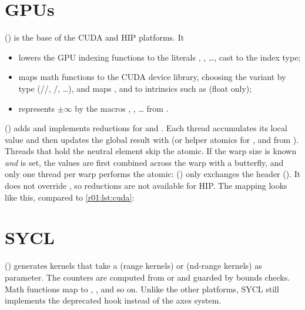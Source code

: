 \section{GPUs}\label{r01:sec:gpu-platforms}

 () is the base of the CUDA and HIP platforms. It
\begin{itemize}
  \item lowers the GPU indexing functions to the literals ,
        , \dots, cast to the index type;
  \item maps math functions to the CUDA device library, choosing the variant by type
        (//, /, \dots), and maps
        ,  and  to intrinsics
        such as  (float only);
  \item represents $\pm\infty$ by the macros ,
        , \dots{} from .
\end{itemize}
 () adds  and
implements reductions for  and . Each thread accumulates its
local value and then updates the global result with  (or helper atomics
for ,  and  from ). Threads that
hold the neutral element skip the atomic. If the warp size is known \emph{and}
 is set, the values are first combined across
the warp with a  butterfly, and only one thread per warp performs
the atomic:
 () only exchanges the header
(). It does not override , so
reductions are not available for HIP. The  mapping looks like this,
compared to \cref{r01:lst:cuda}:

\section{SYCL}
 () generates kernels that take a 
(range kernels) or  (nd-range kernels) as parameter. The counters
are computed from  or  and guarded by bounds
checks. Math functions map to , , and so on. Unlike the
other platforms, SYCL still implements the deprecated
 hook instead of the axes system.

